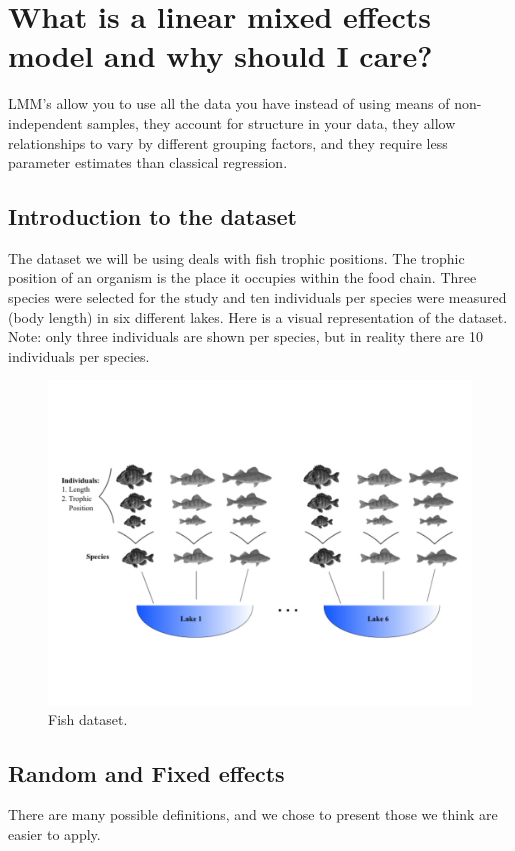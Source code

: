 \documentclass{article}
\begin{document}
\section{What is a linear mixed effects model and why should I care?}
LMM's allow you to use all the data you have instead of using means of non-independent samples, they account for structure in your data, they allow relationships to vary by different grouping factors, and they require less parameter estimates than classical regression.

\subsection{Introduction to the dataset}
The dataset we will be using deals with fish trophic positions. The trophic position of an organism is the place it occupies within the food chain. Three species were selected for the study and ten individuals per species were measured (body length) in six different lakes. Here is a visual representation of the dataset. \\
Note: only three individuals are shown per species, but in reality there are 10 individuals per species.
\begin{figure}[h!]
    \centering
    \includegraphics[scale = 0.5]{images/fish_repartition.pdf}
    \caption{Fish dataset.}
    \label{Fish_dataset}
\end{figure}

\subsection{Random and Fixed effects}
There are many possible definitions, and we chose to present those we think are easier to apply.
\end{document}
